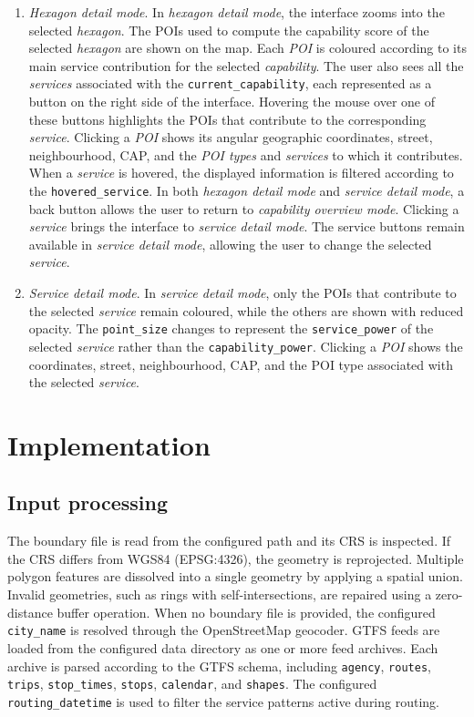\documentclass{article}
\begin{document}
{\begin{enumerate}
    \item \emph{Hexagon detail mode}. In \emph{hexagon detail mode}, the interface zooms into the selected \emph{hexagon}. The POIs used to compute the capability score of the selected \emph{hexagon} are shown on the map. Each \emph{POI} is coloured according to its main service contribution for the selected \emph{capability}. The user also sees all the \emph{services} associated with the \texttt{current\_capability}, each represented as a button on the right side of the interface. Hovering the mouse over one of these buttons highlights the POIs that contribute to the corresponding \emph{service}. Clicking a \emph{POI} shows its angular geographic coordinates, street, neighbourhood, CAP, and the \emph{POI types} and \emph{services} to which it contributes. When a \emph{service} is hovered, the displayed information is filtered according to the \texttt{hovered\_service}. In both \emph{hexagon detail mode} and \emph{service detail mode}, a back button allows the user to return to \emph{capability overview mode}. Clicking a \emph{service} brings the interface to \emph{service detail mode}. The service buttons remain available in \emph{service detail mode}, allowing the user to change the selected \emph{service}.
    \item \emph{Service detail mode}. In \emph{service detail mode}, only the POIs that contribute to the selected \emph{service} remain coloured, while the others are shown with reduced opacity. The \texttt{point\_size} changes to represent the \texttt{service\_power} of the selected \emph{service} rather than the \texttt{capability\_power}. Clicking a \emph{POI} shows the coordinates, street, neighbourhood, CAP, and the POI type associated with the selected \emph{service}.
\end{enumerate}
}

\section{Implementation}
\subsection{Input processing}
The boundary file is read from the configured path and its CRS is inspected. If the CRS differs from WGS84 (EPSG:4326), the geometry is reprojected. Multiple polygon features are dissolved into a single geometry by applying a spatial union. Invalid geometries, such as rings with self-intersections, are repaired using a zero-distance buffer operation. When no boundary file is provided, the configured \texttt{city\_name} is resolved through the OpenStreetMap geocoder.
GTFS feeds are loaded from the configured data directory as one or more feed archives. Each archive is parsed according to the GTFS schema, including \texttt{agency}, \texttt{routes}, \texttt{trips}, \texttt{stop\_times}, \texttt{stops}, \texttt{calendar}, and \texttt{shapes}. The configured \texttt{routing\_datetime} is used to filter the service patterns active during routing.
\end{document}
